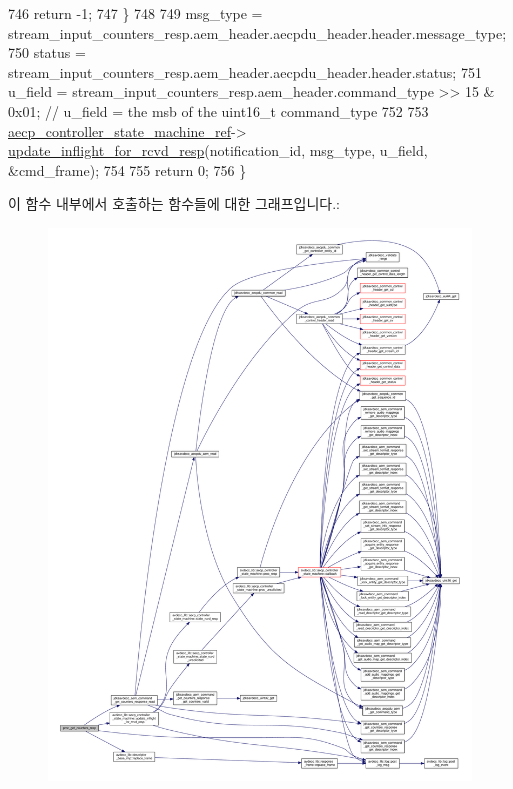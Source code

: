 \begin{DoxyCode}
746         \textcolor{keywordflow}{return} -1;
747     \}
748 
749     msg\_type = stream\_input\_counters\_resp.aem\_header.aecpdu\_header.header.message\_type;
750     status = stream\_input\_counters\_resp.aem\_header.aecpdu\_header.header.status;
751     u\_field = stream\_input\_counters\_resp.aem\_header.command\_type >> 15 & 0x01; \textcolor{comment}{// u\_field = the msb of the
       uint16\_t command\_type}
752 
753     \hyperlink{namespaceavdecc__lib_a0b1b5aea3c0490f77cbfd9178af5be22}{aecp\_controller\_state\_machine\_ref}->
      \hyperlink{classavdecc__lib_1_1aecp__controller__state__machine_a997abd9786c330a5505e903e6443208e}{update\_inflight\_for\_rcvd\_resp}(notification\_id, msg\_type, u\_field, &cmd\_frame);
754 
755     \textcolor{keywordflow}{return} 0;
756 \}
\end{DoxyCode}


이 함수 내부에서 호출하는 함수들에 대한 그래프입니다.\+:
\nopagebreak
\begin{figure}[H]
\begin{center}
\leavevmode
\includegraphics[width=350pt]{classavdecc__lib_1_1stream__input__descriptor__imp_a6aa536a941d8352a30b5976a5224f01d_cgraph}
\end{center}
\end{figure}




